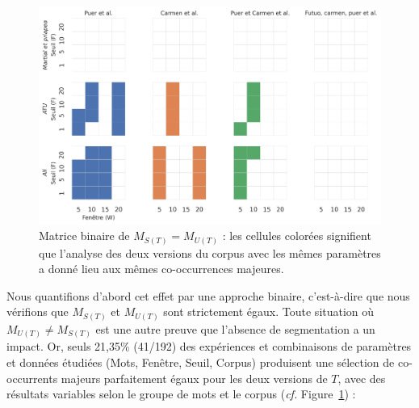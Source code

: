 \begin{figure}[h]
    \centering
    \includegraphics[width=.95\linewidth]{figures/chap1/part2/classes_binary.png}
    \caption{Matrice binaire de $M_{S(T)} = M_{U(T)}$ : les cellules colorées signifient que l'analyse des deux versions du corpus avec les mêmes paramètres a donné lieu aux mêmes co-occurrences majeures.}
    \label{fig:chap1:noise:matrix_classes}
\end{figure}


 Nous quantifions d'abord cet effet par une approche binaire, c'est-à-dire que nous vérifions que $M_{S(T)}$ et $M_{U(T)}$ sont strictement égaux. Toute situation où $M_{U(T)} \neq M_{S(T)}$ est une autre preuve que l'absence de segmentation a un impact. Or, seuls 21,35\% (41/192) des expériences et combinaisons de paramètres et données étudiées (Mots, Fenêtre, Seuil, Corpus) produisent une sélection de co-occurrents majeurs parfaitement égaux pour les deux versions de $T$, avec des résultats variables selon le groupe de mots et le corpus (\textit{cf.} Figure~\ref{fig:chap1:noise:matrix_classes}) :
 


